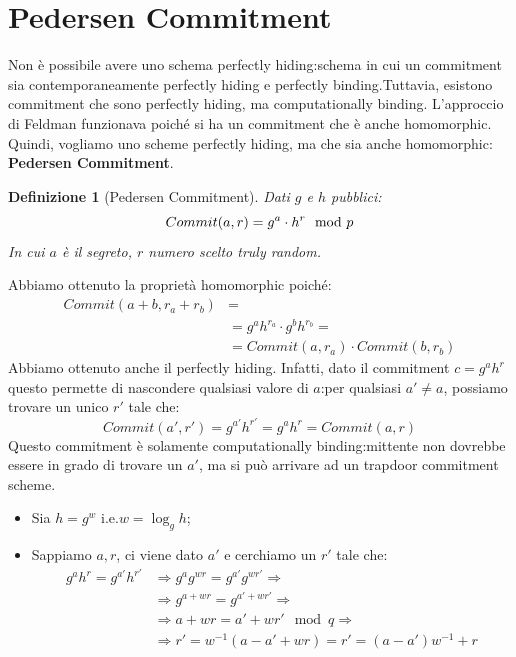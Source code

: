 \documentclass{book}
\newtheorem{Definizione}{\textbf{Definizione}}
\begin{document}
\section{Pedersen Commitment}
Non è possibile avere uno schema perfectly hiding:\@uno schema in cui un commitment sia contemporaneamente perfectly hiding e perfectly binding\@.\newline Tuttavia, esistono commitment che sono perfectly hiding, ma computationally binding\@. L'approccio di Feldman funzionava poiché si ha un commitment che è anche homomorphic\@.\newline
Quindi, vogliamo uno scheme perfectly hiding, ma che sia anche homomorphic: \textbf{Pedersen Commitment}\@.
\begin{Definizione}[Pedersen Commitment] Dati \(g\) e \(h\) pubblici\@:
	\begin{equation*}
		\centering
		Commit(a,r)=g^{a}\cdot h^{r}\mod{p}
	\end{equation*}
	In cui \(a\) è il segreto, \(r\) numero scelto truly random.
\end{Definizione}
Abbiamo ottenuto la proprietà homomorphic poiché:
\begin{align*}
	Commit(a+b,r_{a}+r_{b}) & =                                      \\
	                        & =g^{a}h^{r_{a}}\cdot g^{b}h^{r_{b}}=   \\
	                        & = Commit(a,r_{a})\cdot Commit(b,r_{b})
\end{align*}
Abbiamo ottenuto anche il perfectly hiding\@. Infatti, dato il commitment \(c=g^{a}h^{r}\) questo permette di nascondere qualsiasi valore di \(a\):\@ per qualsiasi \(a'\neq a\), possiamo trovare un unico \(r'\) tale che:\begin{equation*}
	Commit(a',r')=g^{a'}h^{r'}=g^{a}h^{r}=Commit(a,r)
\end{equation*}
Questo commitment è solamente computationally binding:\@il mittente non dovrebbe essere in grado di trovare un \(a'\), ma si può arrivare ad un trapdoor commitment scheme\@.
\begin{itemize}
	\item Sia \(h=g^{w}\) i.e.\(w=\log_{g}{h}\);
	\item Sappiamo \(a,r\), ci viene dato \(a'\) e cerchiamo un \(r'\) tale che:
	      \begin{align*}
		      g^{a}h^{r}=g^{a'}h^{r'} & \Longrightarrow g^{a}g^{wr}=g^{a'}g^{wr'}\Longrightarrow \\
		                              & \Longrightarrow g^{a+wr}=g^{a'+wr'}\Longrightarrow       \\
		                              & \Longrightarrow a+wr=a'+wr' \mod{q}\Longrightarrow       \\
		                              & \Longrightarrow r'=w^{-1}(a-a'+wr)=r'=(a-a')w^{-1}+r
	      \end{align*}
\end{itemize}
\end{document}
